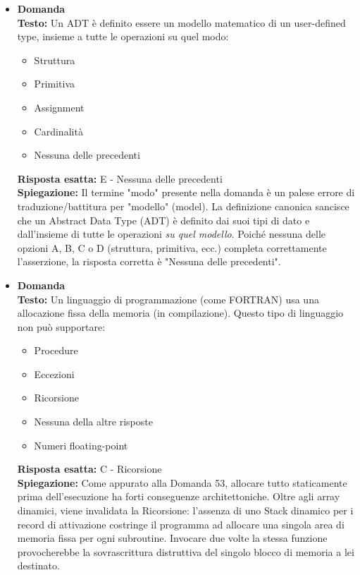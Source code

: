 \documentclass[12pt, a4paper]{article}
\newcounter{domandateoria}
\begin{document}
\begin{itemize}
\newpage

    \item {}\textbf{Domanda \thedomandateoria} \\
    \textbf{Testo:} Un ADT è definito essere un modello matematico di un user-defined type, insieme a tutte le operazioni su quel modo:
    \begin{itemize}
        \item[A)] Struttura
        \item[B)] Primitiva
        \item[C)] Assignment
        \item[D)] Cardinalità
        \item[E)] Nessuna delle precedenti
    \end{itemize}
    \textbf{Risposta esatta:} E - Nessuna delle precedenti \\
    \textbf{Spiegazione:} Il termine "modo" presente nella domanda è un palese errore di traduzione/battitura per "modello" (model). La definizione canonica sancisce che un Abstract Data Type (ADT) è definito dai suoi tipi di dato e dall'insieme di tutte le operazioni \textit{su quel modello}. Poiché nessuna delle opzioni A, B, C o D (struttura, primitiva, ecc.) completa correttamente l'asserzione, la risposta corretta è "Nessuna delle precedenti".
    \vspace{0.3cm}

    \item {}\textbf{Domanda \thedomandateoria} \\
    \textbf{Testo:} Un linguaggio di programmazione (come FORTRAN) usa una allocazione fissa della memoria (in compilazione). Questo tipo di linguaggio non può supportare:
    \begin{itemize}
        \item[A)] Procedure
        \item[B)] Eccezioni
        \item[C)] Ricorsione
        \item[D)] Nessuna della altre risposte
        \item[E)] Numeri floating-point
    \end{itemize}
    \textbf{Risposta esatta:} C - Ricorsione \\
    \textbf{Spiegazione:} Come appurato alla Domanda 53, allocare tutto staticamente prima dell'esecuzione ha forti conseguenze architettoniche. Oltre agli array dinamici, viene invalidata la Ricorsione: l'assenza di uno Stack dinamico per i record di attivazione costringe il programma ad allocare una singola area di memoria fissa per ogni subroutine. Invocare due volte la stessa funzione provocherebbe la sovrascrittura distruttiva del singolo blocco di memoria a lei destinato.
    \vspace{0.3cm}


\end{itemize}
\end{document}
